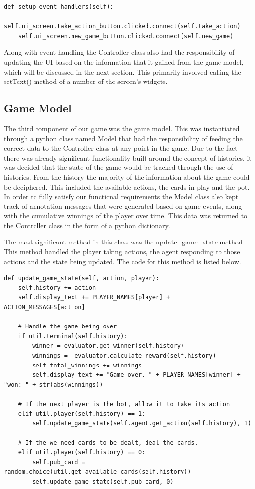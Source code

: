 \begin{lstlisting}[style=Python]
def setup_event_handlers(self):
    self.ui_screen.take_action_button.clicked.connect(self.take_action)
    self.ui_screen.new_game_button.clicked.connect(self.new_game)
\end{lstlisting}

Along with event handling the Controller class also had the responsibility of updating the
UI based on the information that it gained from the game model, which will be discussed in the next section.
This primarily involved calling the setText() method of a number of the screen's widgets.

\subsection{Game Model}\label{subsec:gameModel}
The third component of our game was the game model.
This was instantiated through a python class named Model that had the responsibility of feeding
the correct data to the Controller class at any point in the game.
Due to the fact there was already significant functionality built around the concept of histories,
it was decided that the state of the game would be tracked through the use of histories.
From the history the majority of the information about the game could be deciphered.
This included the available actions, the cards in play and the pot.
In order to fully satisfy our functional requirements the Model class also kept track of annotation messages
that were generated based on game events, along with the cumulative winnings of the player over time.
This data was returned to the Controller class in the
form of a python dictionary.

The most significant method in this class was the update\_game\_state method.
This method handled the player taking actions, the agent responding to those actions and the state being
updated.
The code for this method is listed below.

\begin{lstlisting}[style=Python]
def update_game_state(self, action, player):
    self.history += action
    self.display_text += PLAYER_NAMES[player] + ACTION_MESSAGES[action]

    # Handle the game being over
    if util.terminal(self.history):
        winner = evaluator.get_winner(self.history)
        winnings = -evaluator.calculate_reward(self.history)
        self.total_winnings += winnings
        self.display_text += "Game over. " + PLAYER_NAMES[winner] + "won: " + str(abs(winnings))

    # If the next player is the bot, allow it to take its action
    elif util.player(self.history) == 1:
        self.update_game_state(self.agent.get_action(self.history), 1)

    # If the we need cards to be dealt, deal the cards.
    elif util.player(self.history) == 0:
        self.pub_card = random.choice(util.get_available_cards(self.history))
        self.update_game_state(self.pub_card, 0)
\end{lstlisting}

